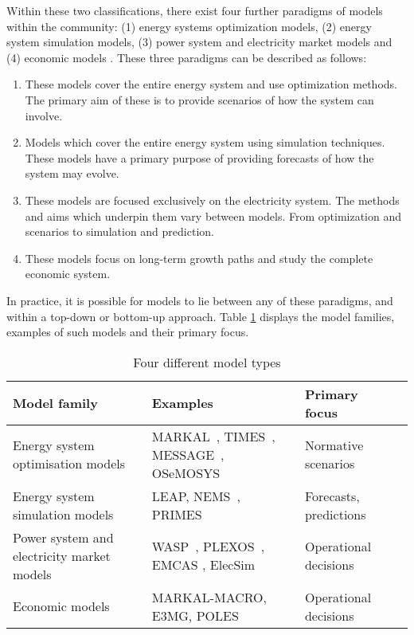 Within these two classifications, there exist four further paradigms of models within the community: (1) energy systems optimization models, (2) energy system simulation models, (3) power system and electricity market models and (4) economic models \cite{Pfenninger2014a}. These three paradigms can be described as follows:

\begin{enumerate}
	\item These models cover the entire energy system and use optimization methods. The primary aim of these is to provide scenarios of how the system can involve.
	\item Models which cover the entire energy system using simulation techniques. These models have a primary purpose of providing forecasts of how the system may evolve.
	\item These models are focused exclusively on the electricity system. The methods and aims which underpin them vary between models. From optimization and scenarios to simulation and prediction.
	\item These models focus on long-term growth paths and study the complete economic system.
\end{enumerate}

In practice, it is possible for models to lie between any of these paradigms, and within a top-down or bottom-up approach. Table \ref{tab:intro:modeltypes} displays the model families, examples of such models and their primary focus.


\begin{table}[]
	\footnotesize
	\caption{Four different model types \cite{Pfenninger2014a}}
	\label{tab:intro:modeltypes}
	\begin{tabular}{p{5cm}p{7cm}ll@{}}
		\toprule
		Model family                               & Examples                                 & Primary focus                            \\ \midrule
		Energy system optimisation models          & MARKAL~\cite{Fishbone1981a}, TIMES~\cite{Giannakidis2013}, MESSAGE~\cite{Schrattenholzer1981}, OSeMOSYS~\cite{Howells2011a}        & Normative scenarios                      \\
		Energy system simulation models            & LEAP\cite{LEAP2012a}, NEMS~\cite{Grozev2005a}, PRIMES\cite{Capros2012}                       & Forecasts, predictions                   \\
		Power system and electricity market models & WASP~\cite{WASP2001}, PLEXOS~\cite{PLEXOS2013}, EMCAS \cite{Conzelmann}, ElecSim\cite{Kell}             & Operational decisions \\
		Economic models & MARKAL-MACRO, E3MG, POLES   & Operational decisions \\
		\bottomrule
	\end{tabular}
\end{table}

